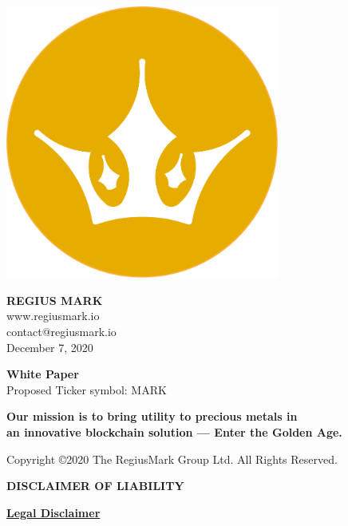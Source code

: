 \documentclass[12pt,a4paper]{article}
\begin{document}
  \begin{center}
    \includegraphics[width=90mm]{logo.png}\\
    \vspace{3mm}

    \vspace{3mm}
    \Huge{\textbf{REGIUS MARK}}\\
    \vspace{3mm}
    \normalsize{www.regiusmark.io}\\
    \normalsize{contact@regiusmark.io}\\
    \normalsize{December 7, 2020}

    \vspace{30mm}
    \Large{\textbf{White Paper}}\\
    \large{Proposed Ticker symbol: MARK}\\
    \vspace{30mm}

    \large{\textbf{Our mission is to bring utility to precious metals in}}\\
    \large{\textbf{an innovative blockchain solution --- Enter the Golden Age.}}

    \vspace*{\fill}
    \normalsize{Copyright ©2020 The RegiusMark Group Ltd. All Rights Reserved.}
  \end{center}

  \newpage
  \begin{center}
    \large{\textbf{DISCLAIMER OF LIABILITY}}
  \end{center}

  \begin{center}
    \textbf{\underline{Legal Disclaimer}}
  \end{center}
\end{document}
